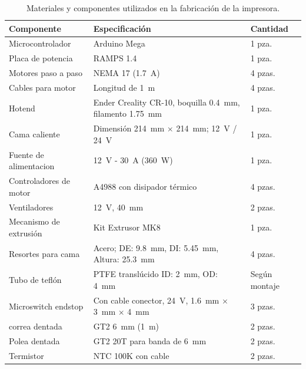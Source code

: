 \begin{table}[htbp]
    \centering
    \small %
    \caption{Materiales y componentes utilizados en la fabricación de la impresora.}
    \label{tab:materiales_componentes}
    \begin{tabularx}{\textwidth}{>{\raggedright\arraybackslash}p{3.8cm} Y l}
        \toprule
        \textbf{Componente} & \textbf{Especificación} & \textbf{Cantidad} \\
        \midrule
        Microcontrolador & Arduino Mega & 1 pza. \\
        Placa de potencia & RAMPS 1.4 & 1 pza. \\
        Motores paso a paso & NEMA 17 (\qty{1.7}{\A}) & 4 pzas. \\
        Cables para motor & Longitud de \qty{1}{\m} & 4 pzas. \\
        Hotend & Ender Creality CR-10, boquilla \qty{0.4}{\mm}, filamento \qty{1.75}{\mm} & 1 pza. \\
        Cama caliente & Dimensión \qty{214}{\mm} $\times$ \qty{214}{\mm}; \qty{12}{\V} / \qty{24}{\V} & 1 pza. \\
        Fuente de alimentacion & \qty{12}{\V} - \qty{30}{\A} (\qty{360}{\W}) & 1 pza. \\
        Controladores de motor & A4988 con disipador térmico & 4 pzas. \\
        Ventiladores & \qty{12}{\V}, \qty{40}{\mm} & 2 pzas. \\
        Mecanismo de extrusión & Kit Extrusor MK8 & 1 pza. \\
        Resortes para cama & Acero; DE: \qty{9.8}{\mm}, DI: \qty{5.45}{\mm}, Altura: \qty{25.3}{\mm} & 4 pzas. \\
        Tubo de teflón & PTFE translúcido ID: \qty{2}{\mm}, OD: \qty{4}{\mm} & Según montaje \\
        Microswitch endstop & Con cable conector, \qty{24}{\V}, \qty{1.6}{\mm} $\times$ \qty{3}{\mm} $\times$ \qty{4}{\mm} & 3 pzas. \\
        correa dentada & GT2 \qty{6}{\mm} (\qty{1}{\m}) & 2 pzas. \\
        Polea dentada & GT2 20T para banda de \qty{6}{\mm} & 2 pzas. \\
        Termistor & NTC 100K con cable & 2 pzas. \\
        \bottomrule
    \end{tabularx}
\end{table}

